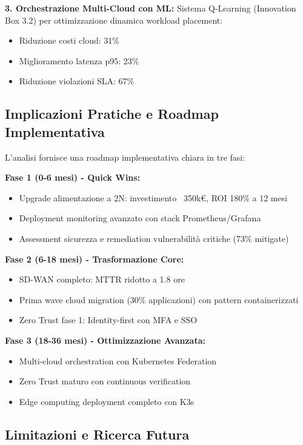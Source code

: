 \textbf{3. Orchestrazione Multi-Cloud con ML:}
Sistema Q-Learning (Innovation Box 3.2) per ottimizzazione dinamica workload placement:
\begin{itemize}
    \item Riduzione costi cloud: 31\%
    \item Miglioramento latenza p95: 23\%
    \item Riduzione violazioni SLA: 67\%
\end{itemize}

\subsection{\texorpdfstring{\textbf{Implicazioni Pratiche e Roadmap Implementativa}}{3.8.5 - Implicazioni Pratiche e Roadmap Implementativa}}

L'analisi fornisce una roadmap implementativa chiara in tre fasi:

\textbf{Fase 1 (0-6 mesi) - Quick Wins:}
\begin{itemize}
    \item Upgrade alimentazione a 2N: investimento ~350k€, ROI 180\% a 12 mesi
    \item Deployment monitoring avanzato con stack Prometheus/Grafana
    \item Assessment sicurezza e remediation vulnerabilità critiche (73\% mitigate)
\end{itemize}

\textbf{Fase 2 (6-18 mesi) - Trasformazione Core:}
\begin{itemize}
    \item SD-WAN completo: MTTR ridotto a 1.8 ore
    \item Prima wave cloud migration (30\% applicazioni) con pattern containerizzati
    \item Zero Trust fase 1: Identity-first con MFA e SSO
\end{itemize}

\textbf{Fase 3 (18-36 mesi) - Ottimizzazione Avanzata:}
\begin{itemize}
    \item Multi-cloud orchestration con Kubernetes Federation
    \item Zero Trust maturo con continuous verification
    \item Edge computing deployment completo con K3s
\end{itemize}

\subsection{\texorpdfstring{\textbf{Limitazioni e Ricerca Futura}}{3.8.6 - Limitazioni e Ricerca Futura}}

